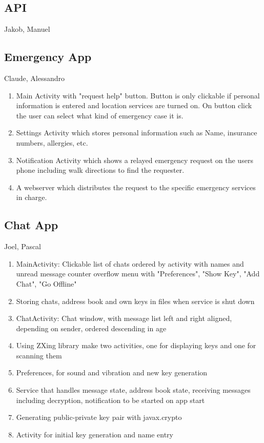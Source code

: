 	
		\subsection{API}
			Jakob, Manuel
		
		\subsection{Emergency App}
			Claude, Alessandro
			\begin{enumerate}
				\item Main Activity with "request help" button. Button is only clickable if personal information is entered and location services are turned on. On button click the user can select what kind of emergency case it is.
				\item Settings Activity which stores personal information such as Name, insurance numbers, allergies, etc.
				\item Notification Activity which shows a relayed emergency request on the users phone including walk directions to find the requester.
				\item A webserver which distributes the request to the specific emergency services in charge.
			\end{enumerate}
		
		\subsection{Chat App}
			Joel, Pascal
			\begin{enumerate}
				\item MainActivity: Clickable list of chats ordered by activity with names and unread message counter overflow menu with "Preferences", "Show Key", "Add Chat", "Go Offline"
				\item Storing chats, address book and own keys in files when service is shut down
				\item ChatActivity: Chat window, with message list left and right aligned, depending on sender, ordered descending in age
				\item Using ZXing library make two activities, one for displaying keys and one for scanning them
				\item Preferences, for sound and vibration and new key generation
				\item Service that handles message state, address book state, receiving messages including decryption, notification to be started on app start
				\item Generating public-private key pair with javax.crypto
				\item Activity for initial key generation and name entry
			\end{enumerate}
			